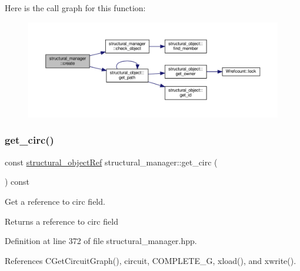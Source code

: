 Here is the call graph for this function\+:
\nopagebreak
\begin{figure}[H]
\begin{center}
\leavevmode
\includegraphics[width=350pt]{d7/d6b/classstructural__manager_a06768a4a0fd1f26e78cbd1186c433261_cgraph}
\end{center}
\end{figure}
\mbox{\label{classstructural__manager_a56ff3164d2a57d12312fa3c7bfceb244}} 
\subsubsection{\texorpdfstring{get\+\_\+circ()}{get\_circ()}}
{\footnotesize\ttfamily const \hyperlink{structural__objects_8hpp_a8ea5f8cc50ab8f4c31e2751074ff60b2}{structural\+\_\+object\+Ref} structural\+\_\+manager\+::get\+\_\+circ (\begin{DoxyParamCaption}{ }\end{DoxyParamCaption}) const\hspace{0.3cm}{\ttfamily [inline]}}



Get a reference to circ field. 

\begin{DoxyReturn}{Returns}
a reference to circ field 
\end{DoxyReturn}


Definition at line 372 of file structural\+\_\+manager.\+hpp.



References C\+Get\+Circuit\+Graph(), circuit, C\+O\+M\+P\+L\+E\+T\+E\+\_\+G, xload(), and xwrite().



